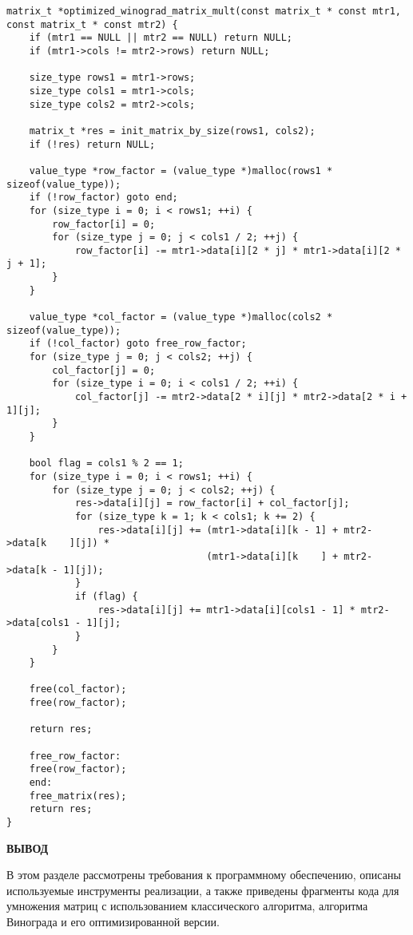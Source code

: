 \begin{center}
\captionsetup{justification=raggedright,singlelinecheck=off}
\begin{lstlisting}[label=lst:opt_win,caption=Оптимизированный алгоритм Винограда]
matrix_t *optimized_winograd_matrix_mult(const matrix_t * const mtr1, const matrix_t * const mtr2) {
    if (mtr1 == NULL || mtr2 == NULL) return NULL;
    if (mtr1->cols != mtr2->rows) return NULL;

    size_type rows1 = mtr1->rows;
    size_type cols1 = mtr1->cols;
    size_type cols2 = mtr2->cols;

    matrix_t *res = init_matrix_by_size(rows1, cols2);
    if (!res) return NULL;

    value_type *row_factor = (value_type *)malloc(rows1 * sizeof(value_type));
    if (!row_factor) goto end;
    for (size_type i = 0; i < rows1; ++i) {
        row_factor[i] = 0;
        for (size_type j = 0; j < cols1 / 2; ++j) {
            row_factor[i] -= mtr1->data[i][2 * j] * mtr1->data[i][2 * j + 1];
        }
    }

    value_type *col_factor = (value_type *)malloc(cols2 * sizeof(value_type));
    if (!col_factor) goto free_row_factor;
    for (size_type j = 0; j < cols2; ++j) {
        col_factor[j] = 0;
        for (size_type i = 0; i < cols1 / 2; ++i) {
            col_factor[j] -= mtr2->data[2 * i][j] * mtr2->data[2 * i + 1][j];
        }
    }

    bool flag = cols1 % 2 == 1;
    for (size_type i = 0; i < rows1; ++i) {
        for (size_type j = 0; j < cols2; ++j) {
            res->data[i][j] = row_factor[i] + col_factor[j];
            for (size_type k = 1; k < cols1; k += 2) {
                res->data[i][j] += (mtr1->data[i][k - 1] + mtr2->data[k    ][j]) *
                                   (mtr1->data[i][k    ] + mtr2->data[k - 1][j]);
            }
            if (flag) {
                res->data[i][j] += mtr1->data[i][cols1 - 1] * mtr2->data[cols1 - 1][j];
            }
        }
    }

    free(col_factor);
    free(row_factor);
    
    return res;

    free_row_factor:
    free(row_factor);
    end:
    free_matrix(res);
    return res;
}
\end{lstlisting}
\end{center}

\vspace{5mm}

\textbf{ВЫВОД}

В этом разделе рассмотрены требования к программному обеспечению, описаны используемые инструменты реализации, а также приведены фрагменты кода для умножения матриц с использованием классического алгоритма, алгоритма Винограда и его оптимизированной версии.

\clearpage